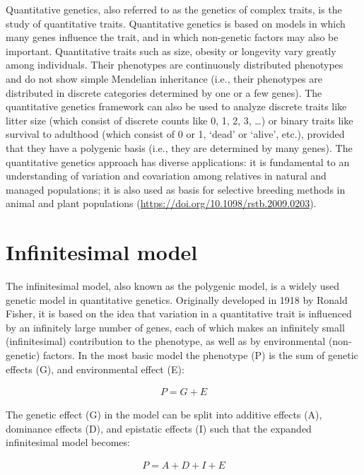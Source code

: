 \documentclass[
]{book}
\begin{document}
Quantitative genetics, also referred to as the genetics of complex traits, is the study of quantitative traits. Quantitative genetics is based on models in which many genes influence the trait, and in which non-genetic factors may also be important. Quantitative traits such as size, obesity or longevity vary greatly among individuals. Their phenotypes are continuously distributed phenotypes and do not show simple Mendelian inheritance (i.e., their phenotypes are distributed in discrete categories determined by one or a few genes). The quantitative genetics framework can also be used to analyze discrete traits like litter size (which consist of discrete counts like 0, 1, 2, 3, \ldots) or binary traits like survival to adulthood (which consist of 0 or 1, `dead' or `alive', etc.), provided that they have a polygenic basis (i.e., they are determined by many genes). The quantitative genetics approach has diverse applications: it is fundamental to an understanding of variation and covariation among relatives in natural and managed populations; it is also used as basis for selective breeding methods in animal and plant populations (\url{https://doi.org/10.1098/rstb.2009.0203}).

\hypertarget{infinitesimal-model}{%
\section{Infinitesimal model}\label{infinitesimal-model}}

The infinitesimal model, also known as the polygenic model, is a widely used genetic model in quantitative genetics. Originally developed in 1918 by Ronald Fisher, it is based on the idea that variation in a quantitative trait is influenced by an infinitely large number of genes, each of which makes an infinitely small (infinitesimal) contribution to the phenotype, as well as by environmental (non-genetic) factors. In the most basic model the phenotype (P) is the sum of genetic effects (G), and environmental effect (E):

\begin{align}
P = G + E
\end{align}

The genetic effect (G) in the model can be split into additive effects (A), dominance effects (D), and epistatic effects (I) such that the expanded infinitesimal model becomes:

\begin{align}
P = A + D + I + E
\end{align}
\end{document}
